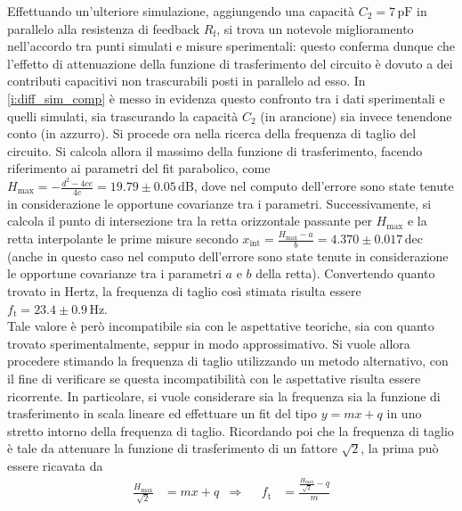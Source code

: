 \documentclass[a4paper,11pt]{article} %
\begin{document}
\noindent Effettuando un'ulteriore simulazione, aggiungendo una capacità $C_{2}=7\,\si{\pF}$ in parallelo alla
resistenza di feedback $R_{\text{f}}$, si trova un notevole miglioramento nell'accordo tra punti simulati e misure
sperimentali: questo conferma dunque che l'effetto di attenuazione della funzione di trasferimento del circuito è dovuto
a dei contributi capacitivi non trascurabili posti in parallelo ad esso. In \autoref{i:diff_sim_comp} è messo in
evidenza questo confronto tra i dati sperimentali e quelli simulati, sia trascurando la capacità $C_{2}$ (in arancione)
sia invece tenendone conto (in azzurro). Si procede ora nella ricerca della frequenza di taglio del circuito. Si calcola
allora il massimo della funzione di trasferimento, facendo riferimento ai parametri del fit parabolico, come
$H_{\text{max}}=-\frac{d^2-4ce}{4c}=19.79\pm 0.05\,\text{dB}$, dove nel computo dell'errore sono state tenute in
considerazione le opportune covarianze tra i parametri. Successivamente, si calcola il punto di intersezione tra la
retta orizzontale passante per $H_{\text{max}}$ e la retta interpolante le prime misure secondo
$x_{\text{int}}=\frac{H_{\text{max}}-a}{b}=4.370 \pm 0.017\,\text{dec}$ (anche in questo caso nel computo dell'errore
sono state tenute in considerazione le opportune covarianze tra i parametri $a$ e $b$ della retta). Convertendo quanto
trovato in Hertz, la frequenza di taglio così stimata risulta essere $f_{\text{t}}=23.4 \pm 0.9\,\si{\Hz}$.\\
Tale valore è però incompatibile sia con le aspettative teoriche, sia con quanto trovato sperimentalmente, seppur in
modo approssimativo. Si vuole allora procedere stimando la frequenza di taglio utilizzando un metodo alternativo, con il
fine di verificare se questa incompatibilità con le aspettative risulta essere ricorrente. In particolare, si vuole
considerare sia la frequenza sia la funzione di trasferimento in scala lineare ed effettuare un fit del tipo $y = mx +
q$ in uno stretto intorno della frequenza di taglio. Ricordando poi che la frequenza di taglio è tale da attenuare la
funzione di trasferimento di un fattore $\sqrt{2}$, la prima può essere ricavata da
\begin{align}
	\frac{H_{\text{max}}}{\sqrt{2}}&=mx+q & \Longrightarrow & & f_{\text{t}}&=\frac{\frac{H_{\text{max}}}{\sqrt{2}}-q}{m}
\end{align}
\end{document}
